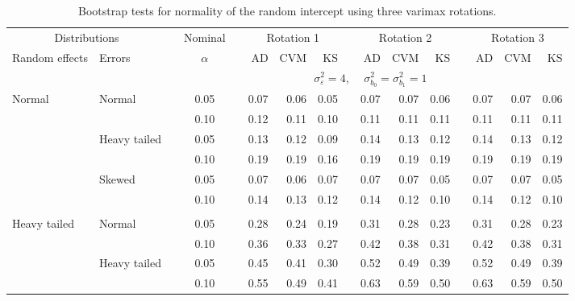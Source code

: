 \documentclass[11pt]{article} %
\begin{document}
\begin{table}[ht]
\begin{scriptsize}
\begin{center}
\begin{tabular}{ll p{.1cm} c p{.1cm} rrr p{.1cm} rrr p{.1cm} rrr}
   \hline
\end{tabular}
\end{center}
\end{scriptsize}
\end{table}

\begin{table}[ht]
\caption{Bootstrap tests for normality of the random intercept using three varimax rotations.}
\begin{scriptsize}
\begin{center}
\begin{tabular}{ll p{.1cm} c p{.1cm} rrr p{.1cm} rrr p{.1cm} rrr}
  \hline
  \multicolumn{2}{c}{Distributions}& & Nominal & &  \multicolumn{3}{c}{Rotation 1} & & \multicolumn{3}{c}{Rotation 2} & & \multicolumn{3}{c}{Rotation 3}\\ \cline{1-2} \cline{6-8} \cline{10-12} \cline{14-16}
  Random effects & Errors & & $\alpha$ & & AD & CVM & KS & & AD & CVM & KS & & AD & CVM & KS \\ 
   \hline
& && && \multicolumn{9}{c}{$\sigma_{\varepsilon}^2 = 4$, \ \ $\sigma_{b_0}^2 = \sigma_{b_1}^2 = 1$} \\ \cline{6-16}
Normal       & Normal       && 0.05 &&  0.07 & 0.06 & 0.05 && 0.07 & 0.07 & 0.06 && 0.07 & 0.07 & 0.06 \\ 
             &              && 0.10 &&  0.12 & 0.11 & 0.10 && 0.11 & 0.11 & 0.11 && 0.11 & 0.11 & 0.11 \\ 
             & Heavy tailed && 0.05 &&  0.13 & 0.12 & 0.09 && 0.14 & 0.13 & 0.12 && 0.14 & 0.13 & 0.12 \\ 
             &              && 0.10 &&  0.19 & 0.19 & 0.16 && 0.19 & 0.19 & 0.19 && 0.19 & 0.19 & 0.19 \\ 
             & Skewed       && 0.05 &&  0.07 & 0.06 & 0.07 && 0.07 & 0.07 & 0.05 && 0.07 & 0.07 & 0.05 \\ 
             &              && 0.10 &&  0.14 & 0.13 & 0.12 && 0.14 & 0.12 & 0.10 && 0.14 & 0.12 & 0.10 \\ 
             &&&&&&&&&&&&&&&\\
Heavy tailed & Normal       && 0.05 &&  0.28 & 0.24 & 0.19 && 0.31 & 0.28 & 0.23 && 0.31 & 0.28 & 0.23 \\ 
             &              && 0.10 &&  0.36 & 0.33 & 0.27 && 0.42 & 0.38 & 0.31 && 0.42 & 0.38 & 0.31 \\ 
             & Heavy tailed && 0.05 &&  0.45 & 0.41 & 0.30 && 0.52 & 0.49 & 0.39 && 0.52 & 0.49 & 0.39 \\ 
             &              && 0.10 &&  0.55 & 0.49 & 0.41 && 0.63 & 0.59 & 0.50 && 0.63 & 0.59 & 0.50 \\ 

\end{tabular}
\end{center}
\end{scriptsize}
\end{table}
\end{document}
